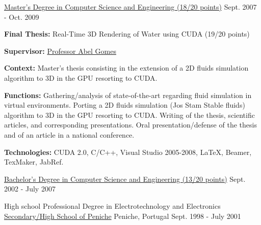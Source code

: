 \begin{cventries}
  \cventry
    {\href{https://www.ubi.pt/en/course/804}{Master's Degree in Computer Science and Engineering (18/20 points)}} %
    {} %
    {} %
    {Sept. 2007 - Oct. 2009} %
    {
      \begin{cvitems} %
        \item {\textbf{Final Thesis:} Real-Time 3D Rendering of Water using CUDA (19/20 points)}
        \item {\textbf{Supervisor:} \href{http://www.di.ubi.pt/~agomes/}{Professor Abel Gomes}}
		\item {\textbf{Context:} Master's thesis consisting in the extension of a 2D fluids simulation algorithm to 3D in the GPU resorting to CUDA. }
		\item {\textbf{Functions:} Gathering/analysis of state-of-the-art regarding fluid simulation in virtual environments. Porting a 2D fluids simulation (Jos Stam Stable fluids) algorithm to 3D in the GPU resorting to CUDA. Writing of the thesis, scientific articles, and corresponding presentations. Oral presentation/defense of the thesis and of an article in a national conference.}
        \item {\textbf{Technologies:} CUDA 2.0, C/C++, Visual Studio 2005-2008, LaTeX, Beamer, TexMaker, JabRef.}
      \end{cvitems}
    }

  \cventry
    {\href{https://www.ubi.pt/en/course/42}{Bachelor's Degree in Computer Science and Engineering (13/20 points)}} %
    {} %
    {} %
    {Sept. 2002 - July 2007} %
    {
    }

  \cventry
    {High school Professional Degree in Electrotechnology and Electronics} %
    {\href{http://espeniche.pt/sitesp/index.php}{Secondary/High School of Peniche}} %
    {Peniche, Portugal} %
    {Sept. 1998 - July 2001} %
    {
    }

\end{cventries}

